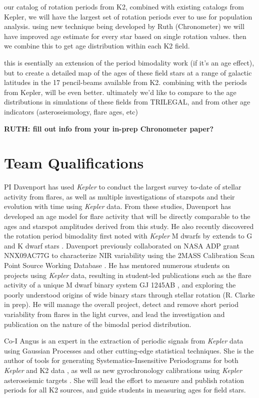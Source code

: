 \documentclass[12pt]{article}
\newcommand{\Kepler}{\textsl{Kepler}\xspace}
\begin{document}
our catalog of rotation periods from K2, combined with existing catalogs from Kepler, we will have the largest set of rotation periods ever to use for population analysis. using new technique being developed by Ruth (Chronometer) we will have improved age estimate for every star based on single rotation values. then we combine this to get age distribution within each K2 field.


this is esentially an extension of the period bimodality work (if it's an age effect), but to create a detailed map of the ages of these field stars at a range of galactic latitudes in the 17 pencil-beams available from K2. combining with the periods from Kepler, will be even better. ultimately we'd like to compare to the age distributions in simulations of these fields from TRILEGAL, and from other age indicators (asteroseismology, flare ages, etc)



{\bf RUTH: fill out info from your in-prep Chronometer paper?}


\section{Team Qualifications}
PI Davenport has used \Kepler to conduct the largest survey to-date of stellar activity from flares, as well as multiple investigations of starspots and their evolution with time using \Kepler data. From these studies, Davenport has developed an age model for flare activity that will be directly comparable to the ages and starspot amplitudes derived from this study. He also recently discovered the rotation period bimodality first noted with \Kepler M dwarfs by \citet{mcquillan2013} extends to G and K dwarf stars \citep{davenport2017}.
Davenport previously collaborated on NASA ADP grant NNX09AC77G to characterize NIR variability using the 2MASS Calibration Scan Point Source Working Database \citep{davenport2012,davenport2015a}.
He has mentored numerous students on projects using \Kepler data, resulting in student-led publications such as the flare activity of a unique M dwarf binary system GJ 1245AB \citep{lurie2015}, and exploring the poorly understood origins of wide binary stars through stellar rotation (R. Clarke in prep). He will manage the overall project, detect and remove short period variability from flares in the light curves, and lead the investigation and publication on the nature of the bimodal period distribution.

Co-I Angus is an expert in the extraction of periodic signals from \Kepler data using Gaussian Processes \citep{angus2016c} and other cutting-edge statistical techniques. She is the author of tools for generating Systematics-Insensitive Periodograms for both \Kepler and K2 data \citep{angus2016}, as well as new gyrochronology calibrations using \Kepler asteroseismic targets \citep{angus2015}. She will lead the effort to measure and publish rotation periods for all K2 sources, and guide students in measuring ages for field stars.
\end{document}
